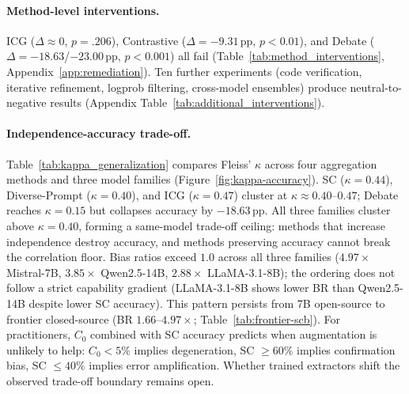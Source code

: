 \paragraph{Method-level interventions.} ICG ($\Delta \approx 0$, $p = .206$), Contrastive ($\Delta = -9.31$\,pp, $p < 0.01$), and Debate ($\Delta = -18.63$/$-23.00$\,pp, $p < 0.001$) all fail (Table~\ref{tab:method_interventions}, Appendix~\ref{app:remediation}). Ten further experiments (code verification, iterative refinement, logprob filtering, cross-model ensembles) produce neutral-to-negative results (Appendix Table~\ref{tab:additional_interventions}).

\paragraph{Independence-accuracy trade-off.} Table~\ref{tab:kappa_generalization} compares Fleiss' $\kappa$ across four aggregation methods and three model families (Figure~\ref{fig:kappa-accuracy}). SC ($\kappa = 0.44$), Diverse-Prompt ($\kappa = 0.40$), and ICG ($\kappa = 0.47$) cluster at $\kappa \approx 0.40$--$0.47$; Debate reaches $\kappa = 0.15$ but collapses accuracy by $-18.63$\,pp. All three families cluster above $\kappa = 0.40$, forming a same-model trade-off ceiling: methods that increase independence destroy accuracy, and methods preserving accuracy cannot break the correlation floor. Bias ratios exceed $1.0$ across all three families ($4.97\times$ Mistral-7B, $3.85\times$ Qwen2.5-14B, $2.88\times$ LLaMA-3.1-8B); the ordering does not follow a strict capability gradient (LLaMA-3.1-8B shows lower BR than Qwen2.5-14B despite lower SC accuracy). This pattern persists from 7B open-source to frontier closed-source (BR $1.66$--$4.97\times$; Table~\ref{tab:frontier-scb}). For practitioners, $C_0$ combined with SC accuracy predicts when augmentation is unlikely to help: $C_0 < 5\%$ implies degeneration, SC $\geq 60\%$ implies confirmation bias, SC $\leq 40\%$ implies error amplification. Whether trained extractors shift the observed trade-off boundary remains open.

